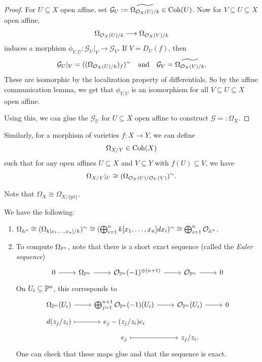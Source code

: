\begin{proof}
  For $U \subseteq X$ open affine,
  set $\mathcal{G}_U := \widetilde{\Omega_{\mathcal{O}_X(U) / k}} \in \operatorname{Coh}(U)$.
  Now for $V \subseteq U \subseteq X$
  open affine,
  \[
    \Omega_{\mathcal{O}_X(U) / k} \longrightarrow \Omega_{\mathcal{O}_X(V) / k}
  \]
  induces a morphism
  $\phi_{V, U} : \mathcal{G}_U|_V
    \to \mathcal{G}_V$. If $V = D_U(f)$,
    then
    \[
      \mathcal{G}_U|_V
      = ((\Omega_{\mathcal{O}_X(U) / k})_f)^\sim
      \quad \text{and} \quad
      \mathcal{G}_V
      = \widetilde{\Omega_{\mathcal{O}_X(V) / k}}.
    \]
    These are isomorphic by the
    localization property of differentials.
    So by the affine communication
    lemma, we get that $\phi_{V, U}$ is
    an isomorphism for all $V \subseteq U \subseteq X$ open affine.

    Using this, we can glue the
    $\mathcal{G}_U$ for $U \subseteq X$
    open affine to construct
    $\mathcal{G} =: \Omega_{X}$.
\end{proof}

\begin{remark}
  Similarly, for a morphism of varieties
  $f : X \to Y$, we can define
  \[
    \Omega_{X / Y} \in \operatorname{Coh}(X)
  \]
  such that for any open affines
  $U \subseteq X$ and $V \subseteq Y$
  with $f(U) \subseteq V$, we have
  \[
    \Omega_{X / Y}|_U
    \cong (\Omega_{\mathcal{O}_X(U) / \mathcal{O}_Y(V)})^\sim.
  \]
\end{remark}

\begin{remark}
  Note that $\Omega_X \cong \Omega_{X / \{\mathrm{pt}\}}$.
\end{remark}

\begin{example}
  We have the following:
  \begin{enumerate}
    \item $\Omega_{\mathbb{A}^n} \cong (\Omega_{k[x_1, \dots, x_n] / k})^\sim \cong (\bigoplus_{i = 1}^n k[x_1, \dots, x_n] dx_i)^\sim \cong \bigoplus_{i = 1}^n \mathcal{O}_{\mathbb{A}^n}$.
    \item To compute $\Omega_{\mathbb{P}^n}$, note
      that there is a short exact sequence
      (called the \emph{Euler sequence})
      \[
        \begin{tikzcd}
          0 \ar[r] & \Omega_{\PP^n} \ar[r] & \OO_{\PP^n}(-1)^{\oplus (n + 1)} \ar[r] & \OO_{\PP^n} \ar[r] & 0
        \end{tikzcd}
      \]
      On $U_i \subseteq \mathbb{P}^n$, this
      corresponds to
      \[
        \begin{tikzcd}[row sep=tiny]
          \Omega_{\PP^n}(U_i)
          \ar[r] & \bigoplus_{j = 1}^{n + 1} \OO_{\PP^n}(-1)(U_i)
          \ar[r] & \OO_{\PP^n}(U_i) \ar[r] & 0 \\
          d(z_j / z_i)
          \ar[r, mapsto]
                 & e_j - (z_j / z_i) e_i \\
                 & e_j \ar[r, mapsto] & z_j / z_i.
        \end{tikzcd}
      \]
      One can check that these maps glue
      and that the sequence is exact.
  \end{enumerate}
\end{example}
